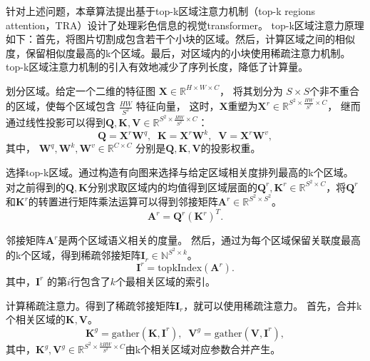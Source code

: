 针对上述问题，本章算法提出基于top-k区域注意力机制（top-k regions attention，TRA）设计了处理彩色信息的视觉transformer。
top-k区域注意力原理如下：首先，将图片切割成包含若干个小块的区域。然后，计算区域之间的相似度，保留相似度最高的k个区域。最后，对区域内的小块使用稀疏注意力机制。top-k区域注意力机制的引入有效地减少了序列长度，降低了计算量。


划分区域。给定一个二维的特征图 $\mathbf{X} \in \mathbb{R}^{H \times W \times C}$，
将其划分为 $S \times S$个非不重合的区域，使每个区域包含 $\frac{HW}{S^2}$ 特征向量，
这时，$\mathbf{X}$重塑为$\mathbf{X}^r \in \mathbb{R}^{S^2 \times \frac{HW}{S^2} \times C}$，
继而通过线性投影可以得到$\mathbf{Q}, \mathbf{K}, \mathbf{V} \in \mathbb{R}^{S^2 \times \frac{HW}{S^2} \times C}$：
\begin{equation}
	\mathbf{Q} = \mathbf{X}^r \mathbf{W}^q, \; \;
	\mathbf{K} = \mathbf{X}^r \mathbf{W}^k, \; \;
	\mathbf{V} = \mathbf{X}^r \mathbf{W}^v,
\end{equation}
其中， $\mathbf{W}^q, \mathbf{W}^k, \mathbf{W}^v \in \mathbb{R}^{C \times C}$ 分别是$\mathbf{Q}, \mathbf{K}, \mathbf{V}$的投影权重。

选择top-k区域。通过构造有向图来选择与给定区域相关度排列最高的k个区域。
对之前得到的$\mathbf{Q}, \mathbf{K}$分别求取区域内的均值得到区域层面的$\mathbf{Q}^r, \mathbf{K}^r \in \mathbb{R}^{S^2 \times C}$，将$\mathbf{Q}^r$和$\mathbf{K}^r$的转置进行矩阵乘法运算可以得到邻接矩阵$\mathbf{A}^r \in \mathbb{R}^{S^2 \times S^2}$。
\begin{equation}
	\mathbf{A}^r = \mathbf{Q}^r (\mathbf{K}^r)^T. 
\end{equation}

邻接矩阵$\mathbf{A}^r$是两个区域语义相关的度量。
然后，通过为每个区域保留关联度最高的k个区域，得到稀疏邻接矩阵$\mathbf{I}_r \in \mathbb{N}^{S^2 \times k}$。
\begin{equation}
	\mathbf{I}^r = \mathrm{topkIndex}(\mathbf{A}^r).
\end{equation}
其中，$\mathbf{I}^r$ 的第$i$行包含了$k$个最相关区域的索引。

计算稀疏注意力。得到了稀疏邻接矩阵$\mathbf{I}_r$，就可以使用稀疏注意力。
首先，合并k个相关区域的$\mathbf{K}, \mathbf{V}$。
\begin{equation}
	\mathbf{K}^{g} = \mathrm{gather}(\mathbf{K}, \mathbf{I}^r), \; \; \mathbf{V}^g = \mathrm{gather}(\mathbf{V}, \mathbf{I}^r),
\end{equation}
其中，$\mathbf{K}^g, \mathbf{V}^g \in \mathbb{R}^{S^2 \times \frac{kHW}{S^2} \times C}$由k个相关区域对应参数合并产生。

